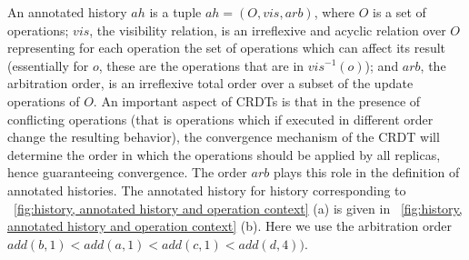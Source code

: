 An annotated history $ah$ is a tuple $ah = (O,\mathit{vis},\mathit{arb})$, where
$O$ is a set of operations; $\mathit{vis}$, the visibility relation, is
an irreflexive and acyclic relation over $O$ representing for each
operation the set of operations which can affect its result
(essentially for $o$, these are the operations that are in
$\mathit{vis}^{-1}(o)$); and $\mathit{arb}$, the arbitration order, is
an irreflexive total order over a subset of the update operations of
$O$.
An important aspect of CRDTs is that in the presence of conflicting
operations (that is operations which if executed in different order
change the resulting behavior), the convergence mechanism of the CRDT
will determine the order in which the operations should be applied by
all replicas, hence guaranteeing convergence.
The order $\mathit{arb}$ plays this role in the definition of
annotated histories.
The annotated history for history corresponding to \figurename~\ref{fig:history, annotated history and operation context} (a) is given in \figurename~\ref{fig:history, annotated
  history and operation context} (b). Here we use the arbitration order $\mathit{add}(b,1) < \mathit{add}(a,1) < \mathit{add}(c,1) < \mathit{add}(d,4))$.
%





